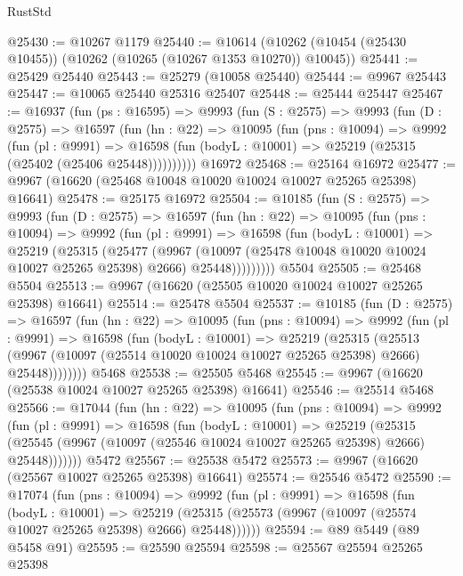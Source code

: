\begin{lexlean}{RustStd}
\begin{coremodule}
@25430 := @10267 @1179
@25440 := @10614 (@10262 (@10454 (@25430 @10455)) (@10262 (@10265 (@10267 @1353 @10270)) @10045))
@25441 := @25429 @25440
@25443 := @25279 (@10058 @25440)
@25444 := @9967 @25443
@25447 := @10065 @25440 @25316 @25407
@25448 := @25444 @25447
@25467 := @16937
    (fun (ps : @16595) =>
    @9993
      (fun (S : @2575) =>
      @9993
        (fun (D : @2575) =>
        @16597
          (fun (hn : @22) =>
          @10095
            (fun (pns : @10094) =>
            @9992
              (fun (pl : @9991) =>
              @16598 (fun (bodyL : @10001) => @25219 (@25315 (@25402 (@25406 @25448))))))))))
    @16972
@25468 := @25164 @16972
@25477 := @9967 (@16620 (@25468 @10048 @10020 @10024 @10027 @25265 @25398) @16641)
@25478 := @25175 @16972
@25504 := @10185
    (fun (S : @2575) =>
    @9993
      (fun (D : @2575) =>
      @16597
        (fun (hn : @22) =>
        @10095
          (fun (pns : @10094) =>
          @9992
            (fun (pl : @9991) =>
            @16598
              (fun (bodyL : @10001) =>
              @25219
                (@25315
                  (@25477
                    (@9967
                      (@10097 (@25478 @10048 @10020 @10024 @10027 @25265 @25398) @2666)
                      @25448)))))))))
    @5504
@25505 := @25468 @5504
@25513 := @9967 (@16620 (@25505 @10020 @10024 @10027 @25265 @25398) @16641)
@25514 := @25478 @5504
@25537 := @10185
    (fun (D : @2575) =>
    @16597
      (fun (hn : @22) =>
      @10095
        (fun (pns : @10094) =>
        @9992
          (fun (pl : @9991) =>
          @16598
            (fun (bodyL : @10001) =>
            @25219
              (@25315
                (@25513
                  (@9967 (@10097 (@25514 @10020 @10024 @10027 @25265 @25398) @2666) @25448))))))))
    @5468
@25538 := @25505 @5468
@25545 := @9967 (@16620 (@25538 @10024 @10027 @25265 @25398) @16641)
@25546 := @25514 @5468
@25566 := @17044
    (fun (hn : @22) =>
    @10095
      (fun (pns : @10094) =>
      @9992
        (fun (pl : @9991) =>
        @16598
          (fun (bodyL : @10001) =>
          @25219
            (@25315 (@25545 (@9967 (@10097 (@25546 @10024 @10027 @25265 @25398) @2666) @25448)))))))
    @5472
@25567 := @25538 @5472
@25573 := @9967 (@16620 (@25567 @10027 @25265 @25398) @16641)
@25574 := @25546 @5472
@25590 := @17074
    (fun (pns : @10094) =>
    @9992
      (fun (pl : @9991) =>
      @16598
        (fun (bodyL : @10001) =>
        @25219 (@25315 (@25573 (@9967 (@10097 (@25574 @10027 @25265 @25398) @2666) @25448))))))
@25594 := @89 @5449 (@89 @5458 @91)
@25595 := @25590 @25594
@25598 := @25567 @25594 @25265 @25398

\end{coremodule}
\end{lexlean}
